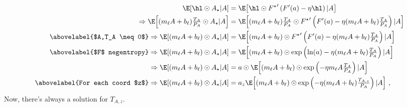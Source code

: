 \begin{align*}
    \E\!\left[
        \hl \odot A_\star
        | A
        \right]
     & =
    \E\!\left[
        \hl \odot {F^\star}'\left(F'(a) - \eta \hl\right)
        | A
        \right]
    \\
    \Rightarrow
    \E\!\left[
        (m_\ell A + b_\ell) \tfrac{T_A}{P_A} \odot A_\star
        | A
        \right]
     & =
    \E\!\left[
        (m_\ell A + b_\ell) \tfrac{T_A}{P_A} \odot {F^\star}'\left(F'(a) - \eta (m_\ell A + b_\ell) \tfrac{T_A}{P_A}\right)
        | A
        \right]
    \\
    \abovelabel{$A,T_A \neq 0$}
    \Rightarrow
    \E\!\left[
        (m_\ell A + b_\ell) \odot A_\star
        | A
        \right]
     & =
    \E\!\left[
        (m_\ell A + b_\ell) \odot {F^\star}'\left(F'(a) - \eta (m_\ell A + b_\ell) \tfrac{T_A}{P_A}\right)
        | A
        \right]
    \\
    \abovelabel{$F$ negentropy}
    \Rightarrow
    \E\!\left[
        (m_\ell A + b_\ell) \odot A_\star
        | A
        \right]
     & =
    \E\!\left[
        (m_\ell A + b_\ell) \odot \exp\left(\ln(a) - \eta (m_\ell A + b_\ell) \tfrac{T_A}{P_A}\right)
        | A
        \right]
    \\
    \Rightarrow
    \E\!\left[
        (m_\ell A + b_\ell) \odot A_\star
        | A
        \right]
     & =
    a \odot
    \E\!\left[
        (m_\ell A + b_\ell) \odot \exp\left(- \eta m_\ell A \tfrac{T_A}{P_A}\right)
        | A
        \right]
    \\
    \abovelabel{For each coord $z$}
    \Rightarrow
    \E\!\left[
        (m_\ell A + b_\ell) \odot A_\star
        | A
        \right]
     & =
    a_z
    \E\!\left[
        (m_\ell A + b_\ell) \odot \exp\left(- \eta (m_\ell A + b_\ell) \tfrac{T_{A,z}}{P_A}\right)
        | A
        \right]\,,
\end{align*}
Now, there's always a solution for $T_{A,z}$.